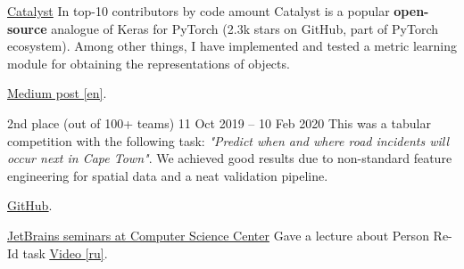 
\cvevent
{\href{https://github.com/catalyst-team/catalyst}{Catalyst}}
{In top-10 contributors by code amount}{}{}
Catalyst is a popular \textbf{open-source} analogue of Keras for PyTorch (2.3k stars on GitHub, part of PyTorch ecosystem).
Among other things, I have implemented and tested a metric learning module for obtaining the representations of objects.
\smallskip

\href{https://medium.com/pytorch/metric-learning-with-catalyst-8c8337dfab1a}{\underline{Medium post} [en]}.

\divider

{2nd place (out of 100+ teams)}
{11 Oct 2019 -- 10 Feb 2020}{}
This was a tabular competition with the following task: \textit{"Predict when and where road incidents will occur next in Cape Town"}. We achieved good results due to non-standard feature engineering for spatial data and a neat validation pipeline.
\smallskip

\href{https://github.com/AlekseySh/uber_competition}{\underline{GitHub}}.

\divider

\cvevent
{\href{https://research.jetbrains.org/groups/plt_lab/seminars}{JetBrains seminars at Computer Science Center}}
{Gave a lecture about Person Re-Id task}
{}
{}
{\href{https://youtu.be/O8qtBYeOSKE}{\underline{Video} [ru]}.}
